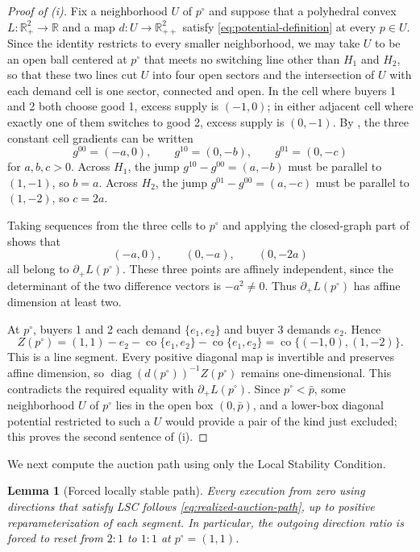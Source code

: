 \documentclass[11pt,a4paper,fleqn]{article}
\theoremstyle{plain}
\newtheorem{lemma}{Lemma}[section]
\theoremstyle{definition}
\newcommand{\R}{\mathbb{R}}
\newcommand{\co}{\operatorname{co}}
\newcommand{\diag}{\operatorname{diag}}
\begin{document}
\begin{proof}[Proof of (i)]
Fix a neighborhood $U$ of $p^\circ$ and suppose that a polyhedral convex $L:\R_+^2\to\R$ and a map $d:U\to\R_{++}^2$ satisfy \eqref{eq:potential-definition} at every $p\in U$. Since the identity restricts to every smaller neighborhood, we may take $U$ to be an open ball centered at $p^\circ$ that meets no switching line other than $H_1$ and $H_2$, so that these two lines cut $U$ into four open sectors and the intersection of $U$ with each demand cell is one sector, connected and open. In the cell where buyers 1 and 2 both choose good 1, excess supply is $(-1,0)$; in either adjacent cell where exactly one of them switches to good 2, excess supply is $(0,-1)$. By , the three constant cell gradients can be written
\[
g^{00}=(-a,0),\qquad
g^{10}=(0,-b),\qquad
g^{01}=(0,-c)
\]
for $a,b,c>0$. Across $H_1$, the jump $g^{10}-g^{00}=(a,-b)$ must be parallel to $(1,-1)$, so $b=a$. Across $H_2$, the jump $g^{01}-g^{00}=(a,-c)$ must be parallel to $(1,-2)$, so $c=2a$.

Taking sequences from the three cells to $p^\circ$ and applying the closed-graph part of  shows that
\[
(-a,0),\qquad(0,-a),\qquad(0,-2a)
\]
all belong to $\partial_+L(p^\circ)$. These three points are affinely independent, since the determinant of the two difference vectors is $-a^2\ne0$. Thus $\partial_+L(p^\circ)$ has affine dimension at least two.

At $p^\circ$, buyers 1 and 2 each demand $\{e_1,e_2\}$ and buyer 3 demands $e_2$. Hence
\begin{equation}\label{eq:path-Z-turn}
Z(p^\circ)
=(1,1)-e_2-\co\{e_1,e_2\}-\co\{e_1,e_2\}
=\co\{(-1,0),(1,-2)\}.
\end{equation}
This is a line segment. Every positive diagonal map is invertible and preserves affine dimension, so $\diag(d(p^\circ))^{-1}Z(p^\circ)$ remains one-dimensional. This contradicts the required equality with $\partial_+L(p^\circ)$. Since $p^\circ<\bar p$, some neighborhood $U$ of $p^\circ$ lies in the open box $(0,\bar p)$, and a lower-box diagonal potential restricted to such a $U$ would provide a pair of the kind just excluded; this proves the second sentence of (i).
\end{proof}

We next compute the auction path using only the Local Stability Condition.

\begin{lemma}[Forced locally stable path]\label{lem:forced-path}
Every execution from zero using directions that satisfy LSC follows \eqref{eq:realized-auction-path}, up to positive reparameterization of each segment. In particular, the outgoing direction ratio is forced to reset from $2{:}1$ to $1{:}1$ at $p^\circ=(1,1)$.
\end{lemma}
\end{document}
